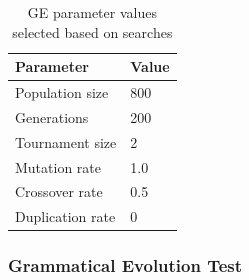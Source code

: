 \begin{table}
    \centering
    \begin{tabular}{| l | l |}
    \hline
    \textbf{Parameter} & \textbf{Value} \\ \hline
    Population size & 800 \\
    \hline
    Generations & 200 \\
    \hline
    Tournament size & 2 \\
    \hline
    Mutation rate & 1.0 \\
    \hline
    Crossover rate & 0.5 \\
    \hline
    Duplication rate & 0 \\
    \hline
    \end{tabular}
    \caption[GE parameter values selected based on searches]{\gls{GE} parameter values selected based on searches}
    \label{tab:ge-parameters}
\end{table}

\subsubsection{Grammatical Evolution Test}
\label{sec:ge-test-res}

